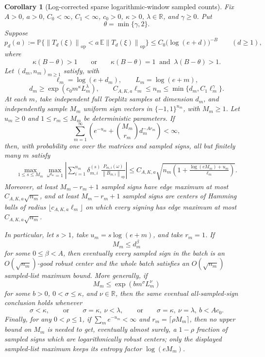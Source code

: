 \documentclass[11pt]{amsart}
\numberwithin{equation}{section}
\newtheorem{corollary}[theorem]{Corollary}
\theoremstyle{definition}
\theoremstyle{remark}
\newcommand{\op}{\mathrm{op}}
\newcommand{\Prob}{\mathbb P}
\newcommand{\Exp}{\mathbb E}
\newcommand{\norm}[1]{\left\lVert #1\right\rVert}
\begin{document}
\begin{corollary}[Log-corrected sparse logarithmic-window sampled counts]
\label{cor:normalizer-tail-borel-window-log-corrected-counts}
Fix \(A>0\), \(a>0\), \(C_0<\infty\), \(C_1<\infty\), \(c_0>0\),
\(\kappa>0\), \(\lambda\in\mathbb R\), and \(\gamma\ge0\).  Put
\[
  \theta=\min\{\gamma,2\}.
\]
Suppose
\[
  p_d(a):=\Prob\{\norm{T_d(\xi)}_{\op}<a\,\Exp\norm{T_d(\xi)}_{\op}\}
  \le C_0\bigl(\log(e+d)\bigr)^{-B}
  \qquad(d\ge1),
\]
where
\[
  \kappa(B-\theta)>1
  \qquad\text{or}\qquad
  \kappa(B-\theta)=1\ \text{ and }\ \lambda(B-\theta)>1 .
\]
Let \((d_m,n_m)_{m\ge1}\) satisfy, with
\[
  \ell_m=\log(e+d_m),\qquad L_m=\log(e+m),
\]
\[
  d_m\ge\exp(c_0m^\kappa L_m^\lambda),
  \qquad
  C_{A,K,a}\ell_m\le n_m\le \min\{d_m,C_1\ell_m^\gamma\}.
\]
At each \(m\), take independent full Toeplitz samples at dimension \(d_m\), and
independently sample \(M_m\) uniform sign vectors in \(\{-1,1\}^{n_m}\), with
\(M_m\ge1\).  Let \(u_m\ge0\) and \(1\le r_m\le M_m\) be deterministic
parameters.  If
\[
  \sum_{m=1}^{\infty}
  \left(e^{-u_m}+\binom{M_m}{r_m}d_m^{-A r_m}\right)<\infty,
\]
then, with probability one over the matrices and sampled signs, all but
finitely many \(m\) satisfy
\[
\begin{aligned}
  \max_{1\le s\le M_m}\max_{\omega^{d_m}=1}
  \left|\sum_{i=1}^{n_m}\delta_{m,i}^{(s)}
  \frac{P_{m,i}(\omega)}{\norm{B_{m,i}}_{\op}}\right|
  \le
  C_{A,K,a}\sqrt{
    n_m\left(1+\frac{\log(eM_m)+u_m}{\ell_m}\right)} .
\end{aligned}
\]
Moreover, at least \(M_m-r_m+1\) sampled signs have edge maximum at most
\(C_{A,K,a}\sqrt{n_m}\), and at least \(M_m-r_m+1\) sampled signs are centers
of Hamming balls of radius \(\lfloor c_{A,K,a}\ell_m\rfloor\) on which every
signing has edge maximum at most \(C_{A,K,a}\sqrt{n_m}\).

In particular, let \(s>1\), take \(u_m=s\log(e+m)\), and take \(r_m=1\).  If
\[
  M_m\le d_m^\beta
\]
for some \(0\le\beta<A\), then eventually every sampled sign in the batch is an
\(O(\sqrt{n_m})\)-good robust center and the whole batch satisfies an
\(O(\sqrt{n_m})\) sampled-list maximum bound.  More generally, if
\[
  M_m\le \exp(bm^\sigma L_m^\nu)
\]
for some \(b>0\), \(0<\sigma\le\kappa\), and \(\nu\in\mathbb R\), then the same
eventual all-sampled-sign conclusion holds whenever
\[
  \sigma<\kappa,
  \qquad\text{or}\qquad
  \sigma=\kappa,\ \nu<\lambda,
  \qquad\text{or}\qquad
  \sigma=\kappa,\ \nu=\lambda,\ b<Ac_0 .
\]
Finally, for any \(0<\rho\le1\), if \(\sum_m e^{-u_m}<\infty\) and
\(r_m=\lceil\rho M_m\rceil\), then no upper bound on \(M_m\) is needed to get,
eventually almost surely, a \(1-\rho\) fraction of sampled signs which are
logarithmically robust centers; only the displayed sampled-list maximum keeps
its entropy factor \(\log(eM_m)\).
\end{corollary}
\end{document}
